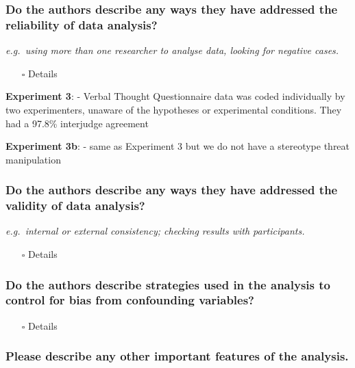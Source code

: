 \documentclass[
  doc, a4paper]{apa7}
\providecommand{\tightlist}{%
  \setlength{\itemsep}{0pt}\setlength{\parskip}{0pt}}
\begin{document}
\subsubsection{Do the authors describe any ways they have addressed the reliability of data analysis?}\label{do-the-authors-describe-any-ways-they-have-addressed-the-reliability-of-data-analysis}

\emph{e.g.~using more than one researcher to analyse data, looking for negative cases.}

\begin{itemize}
\tightlist
\item[$\square$]
  Details
\end{itemize}

\textbf{Experiment 3}:
- Verbal Thought Questionnaire data was coded individually by two experimenters, unaware of the hypotheses or experimental conditions. They had a 97.8\% interjudge agreement

\textbf{Experiment 3b}:
- same as Experiment 3 but we do not have a stereotype threat manipulation

\subsubsection{Do the authors describe any ways they have addressed the validity of data analysis?}\label{do-the-authors-describe-any-ways-they-have-addressed-the-validity-of-data-analysis}

\emph{e.g.~internal or external consistency; checking results with participants.}

\begin{itemize}
\tightlist
\item[$\square$]
  Details
\end{itemize}

\subsubsection{Do the authors describe strategies used in the analysis to control for bias from confounding variables?}\label{do-the-authors-describe-strategies-used-in-the-analysis-to-control-for-bias-from-confounding-variables}

\begin{itemize}
\tightlist
\item[$\square$]
  Details
\end{itemize}

\subsubsection{Please describe any other important features of the analysis.}\label{please-describe-any-other-important-features-of-the-analysis.}
\end{document}
